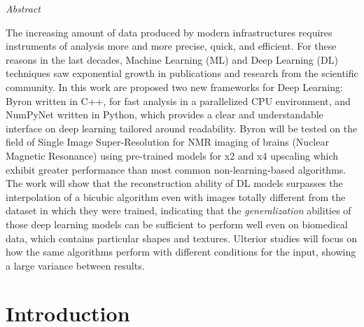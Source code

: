 \documentclass[12pt,a4paper]{report}
\begin{document}
\newpage

\vspace*{125px}
\LARGE\textit{Abstract}
\normalsize
\vspace{2mm}

The increasing amount of data produced by modern infrastructures requires instruments of analysis more and more precise, quick, and efficient. 
For these reasons in the last decades, Machine Learning (ML) and Deep Learning (DL) techniques saw exponential growth in publications and research from the scientific community.
In this work are proposed two new frameworks for Deep Learning: Byron written in C++, for fast analysis in a parallelized CPU environment, and NumPyNet written in Python, which provides a clear and understandable interface on deep learning tailored around readability. 
Byron will be tested on the field of Single Image Super-Resolution for NMR imaging of brains (Nuclear Magnetic Resonance) using pre-trained models for x2 and x4 upscaling which exhibit greater performance than most common non-learning-based algorithms. 
The work will show that the reconstruction ability of DL models surpasses the interpolation of a bicubic algorithm even with images totally different from the dataset in which they were trained, indicating that the {\it generalization} abilities of those deep learning models can be sufficient to perform well even on biomedical data, which contains particular shapes and textures.
Ulterior studies will focus on how the same algorithms perform with different conditions for the input, showing a large variance between results. 


\newpage
\normalsize 

\tableofcontents

\chapter{Introduction}
\end{document}
